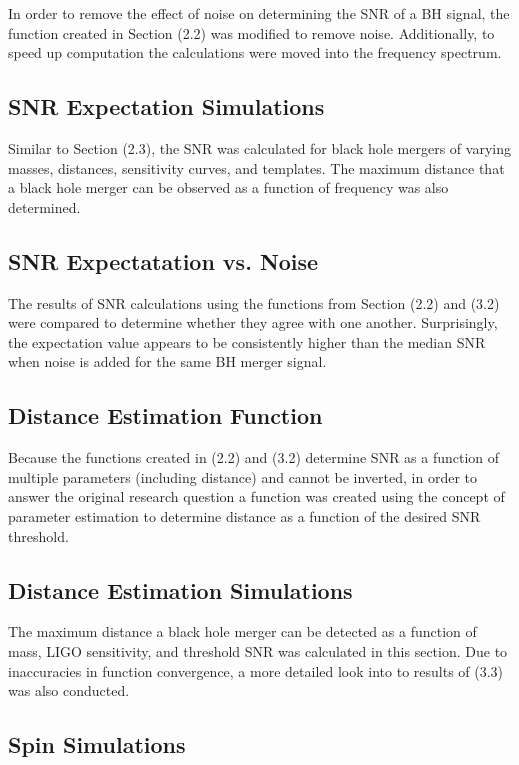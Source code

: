 \documentclass[10pt]{article}
\begin{document}
\begin{multicols*}{2}
In order to remove the effect of noise on determining the SNR of a BH signal, the function created in Section (2.2) was modified to remove noise. Additionally, to speed up computation the calculations were moved into the frequency spectrum. 

\subsection{SNR Expectation Simulations}

Similar to Section (2.3), the SNR was calculated for black hole mergers of varying masses, distances, sensitivity curves, and templates. The maximum distance that a black hole merger can be observed as a function of frequency was also determined. 

\subsection{SNR Expectatation vs. Noise}

The results of SNR calculations using the functions from Section (2.2) and (3.2) were compared to determine whether they agree with one another. Surprisingly, the expectation value appears to be consistently higher than the median SNR when noise is added for the same BH merger signal. 

\subsection{Distance Estimation Function}

Because the functions created in (2.2) and (3.2) determine SNR as a function of multiple parameters (including distance) and cannot be inverted, in order to answer the original research question a function was created using the concept of parameter estimation to determine distance as a function of the desired SNR threshold. 

\subsection{Distance Estimation Simulations}

The maximum distance a black hole merger can be detected as a function of mass, LIGO sensitivity, and threshold SNR was calculated in this section. Due to inaccuracies in function convergence, a more detailed look into to results of (3.3) was also conducted. 

\subsection{Spin Simulations}


\end{multicols*}
\end{document}
